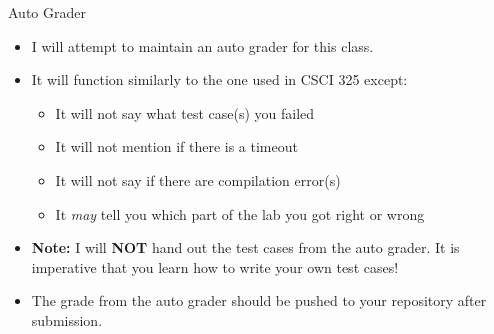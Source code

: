 \documentclass{beamer}
\begin{document}
\begin{frame}{Auto Grader}
\begin{itemize}
\item I will attempt to maintain an auto grader for this class.
\item It will function similarly to the one used in CSCI 325 except:
\begin{itemize}
\item It will not say what test case(s) you failed
\item It will not mention if there is a timeout
\item It will not say if there are compilation error(s)
\item It \textit{may} tell you which part of the lab you got right or wrong
\end{itemize}
\item \textbf{Note:} I will \textbf{NOT} hand out the test cases from the auto grader.  It is imperative that you learn how to write your own test cases!
\item The grade from the auto grader should be pushed to your repository after submission.
\end{itemize}
\end{frame}
\end{document}
